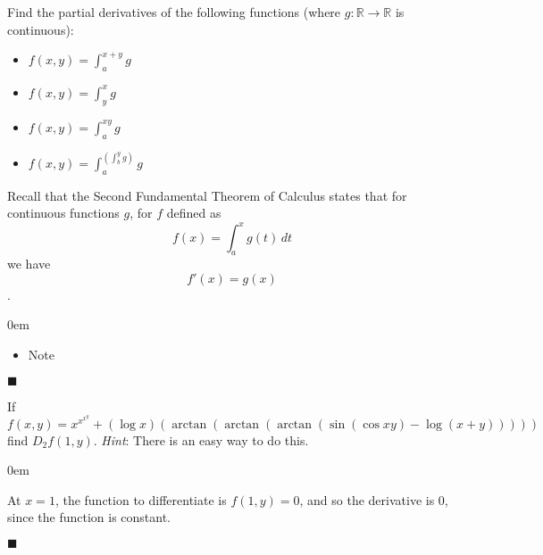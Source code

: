 \documentclass[12pt]{article}
\renewcommand{\qed}{\hfill$\blacksquare$}
\renewenvironment{proof}{\begin{addmargin}[1em]{0em}\begin{newproof}}{\end{newproof}\end{addmargin}\qed}
\newenvironment{problem}[2][Problem]{\begin{trivlist}
\item[\hskip \labelsep {\bfseries #1}\hskip \labelsep {\bfseries #2.}]}{\end{trivlist}}
\begin{document}
\begin{problem}{2.18}
Find the partial derivatives of the following functions (where $g:\mathbb{R}\rightarrow \mathbb{R}$ is continuous):
\begin{itemize}
	\item $f\left(x,y\right) = \int_a^{x+y} g$
	\item $f\left(x,y\right) = \int_y^x g$
	\item $f\left(x,y\right) = \int_a^{xy} g$
	\item $f\left(x,y\right) = \int_a^{\left( \int_b^y g\right)} g$
\end{itemize}
\end{problem}
Recall that the Second Fundamental Theorem of Calculus states that for continuous functions $g$, for $f$ defined as $$ f\left(x\right) = \int_a^x g\left(t\right)\, dt $$ we have $$ f'\left(x\right) = g\left(x\right)$$.\\

\begin{proof}
\begin{itemize}
	\item Note
\end{itemize}
\end{proof}

















\begin{problem}{2.19}
If $f\left(x,y\right) = x^{x^{x^y}} + \left(\log x\right) \left(\arctan \left(\arctan\left(\arctan \left(\sin \left(\cos xy\right)-\log \left(x+y\right)\right)\right)\right) \right)$ find $D_2f\left(1,y\right)$. \textit{Hint}: There is an easy way to do this.
\end{problem}
\begin{proof}
At $x=1$, the function to differentiate is $f\left(1,y\right) = 0$, and so the derivative is $0$, since the function is constant.
\end{proof}
\end{document}

